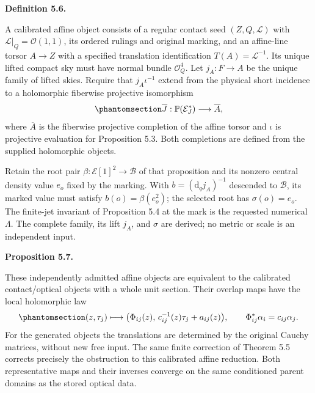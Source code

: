 \documentclass[
  english,
  11pt,
  reqno]{amsart}
\makeatletter
\newcommand{\pandocstatementheading}[1]{%
  \par\addpenalty{\@beginparpenalty}%
  \addvspace{.5\baselineskip plus .2\baselineskip minus .2\baselineskip}%
  {\normalfont\bfseries #1\par}%
  \nobreak\@afterindenttrue\@afterheading
}
\makeatother
\begin{document}
\pandocstatementheading{\protect{}\label{def:gg-independent-affine}Definition 5.6.}

A calibrated affine object consists of a regular contact seed
\((Z,Q,\mathcal L)\) with \(\mathcal L|_Q=\mathcal O(1,1)\), its ordered
rulings and original marking, and an affine-line torsor \(A\to Z\) with
a specified translation identification \(T(A)=\mathcal L^{-1}\). Its
unique lifted compact sky must have normal bundle \(\mathcal O_Q^4\).
Let \(j_A:F\to A\) be the unique family of lifted skies. Require that
\(j_A\iota^{-1}\) extend from the physical short incidence to a
holomorphic fiberwise projective isomorphism
\begin{equation}\protect\phantomsection\label{eq:gg-independent-projective-extension}{
 \overline J:\mathbb P(\mathcal E_J^*)\longrightarrow\overline A ,
}\end{equation} where \(\overline A\) is the fiberwise projective
completion of the affine torsor and \(\iota\) is projective evaluation
for Proposition 5.3. Both completions are defined from the supplied
holomorphic objects.

Retain the root pair \(\beta:\mathcal E[1]^2\to\mathcal B\) of that
proposition and its nonzero central density value \(e_o\) fixed by the
marking. With \(b=(\mathrm d_qj_A)^{-1}\) descended to \(\mathcal B\),
its marked value must satisfy \(b(o)=\beta(e_o^2)\); the selected root
has \(\sigma(o)=e_o\). The finite-jet invariant of Proposition 5.4 at
the mark is the requested numerical \(\Lambda\). The complete family,
its lift \(j_A\), and \(\sigma\) are derived; no metric or scale is an
independent input.

\pandocstatementheading{\protect{}\label{prop:gg-affine-equivalence}Proposition 5.7.}

These independently admitted affine objects are equivalent to the
calibrated contact/optical objects with a whole unit section. Their
overlap maps have the local holomorphic law
\begin{equation}\protect\phantomsection\label{eq:gg-affine-local-law}{
 (z,\tau_j)\longmapsto
       \bigl(\Phi_{ij}(z),\,c_{ij}^{-1}(z)\tau_j+a_{ij}(z)\bigr),
 \qquad \Phi_{ij}^*\alpha_i=c_{ij}\alpha_j.
}\end{equation} For the generated objects the translations are
determined by the original Cauchy matrices, without new free input. The
same finite correction of Theorem 5.5 corrects precisely the obstruction
to this calibrated affine reduction. Both representative maps and their
inverses converge on the same conditioned parent domains as the stored
optical data.
\end{document}
